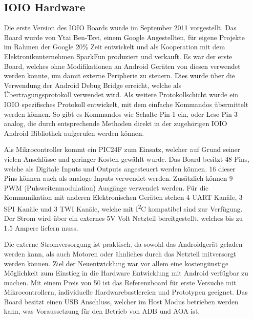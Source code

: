 \documentclass[12pt,journal,compsoc]{IEEEtran}
\begin{document}
\subsection{IOIO Hardware}
Die erste Version des IOIO Boards wurde im September 2011 vorgestellt. Das Board wurde von Ytai Ben-Tsvi, einem Google Angestellten, für eigene Projekte im Rahmen der Google 20\% Zeit entwickelt und als Kooperation mit dem Elektronikunternehmen SparkFun produziert und verkauft.
Es war der erste Board, welches ohne Modifikationen an Android Geräten von diesen verwendet werden konnte, um damit externe Peripherie zu steuern.
Dies wurde über die Verwendung der Android Debug Bridge erreicht, welche als Übertragungsprotokoll verwendet wird.
Als weitere Protokollschicht wurde ein IOIO spezifisches Protokoll entwickelt, mit dem einfache Kommandos übermittelt werden können.
So gibt es Kommandos wie \glqq Schalte Pin 1 ein\grqq, oder \glqq Lese Pin 3 analog\grqq, die durch entsprechende Methoden direkt in der zugehörigen IOIO Android Bibliothek aufgerufen werden können.

Als Mikrocontroller kommt ein PIC24F zum Einsatz, welcher auf Grund seiner vielen Anschlüsse und geringer Kosten gewählt wurde.
Das Board besitzt 48 Pins, welche als Digitale Inputs und Outputs angesteuert werden können. 16 dieser Pins können auch als analoge Inputs verwendet werden.
Zusätzlich können 9 PWM (Pulsweitenmodulation) Ausgänge verwendet werden.
Für die Kommunikation mit anderen Elektronischen Geräten stehen 4 UART Kanäle, 3 SPI Kanäle und 3 TWI Kanäle, welche mit I\textsuperscript{2}C kompatibel sind zur Verfügung.
Der Strom wird über ein externes 5V Volt Netzteil bereitgestellt, welches bis zu 1.5 Ampere liefern muss.

Die externe Stromversorgung ist praktisch, da sowohl das Androidgerät geladen werden kann, als auch Motoren oder ähnliches durch das Netzteil mitversorgt werden können.
Ziel der Neuentwicklung war vor allem eine kostengünstige Möglichkeit zum Einstieg in die Hardware Entwicklung mit Android verfügbar zu machen.
Mit einem Preis von 50\textdollar{} ist das Referenzboard für erste Versuche mit Mikrocontrollern, individuelle Hardwarebastlereien und Prototypen geeignet.
Das Board besitzt einen USB Anschluss, welcher im Host Modus betrieben werden kann, was Voraussetzung für den Betrieb von ADB und AOA ist.
\end{document}
